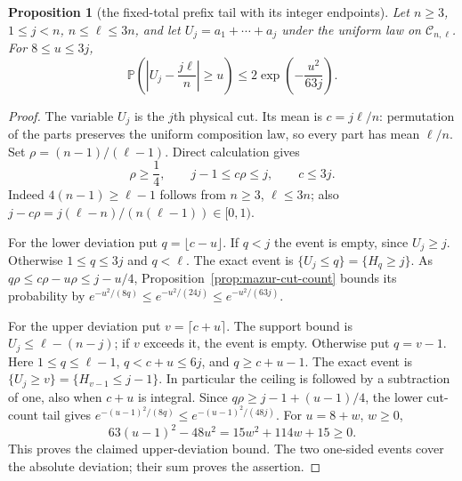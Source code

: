 \documentclass[11pt]{article}
\newtheorem{proposition}{Proposition}
\theoremstyle{remark}\newtheorem{remark}[proposition]{Remark}
\begin{document}
\begin{proposition}[the fixed-total prefix tail with its integer endpoints]
\label{prop:mazur-order-statistic}
Let $n\ge3$, $1\le j<n$, $n\le\ell\le3n$, and let
$U_j=a_1+\cdots+a_j$ under the uniform law on $\mathcal C_{n,\ell}$.
For $8\le u\le3j$,
\begin{equation}
 \mathbb P\left(\left|U_j-\frac{j\ell}{n}\right|\ge u\right)
 \le 2\exp\left(-\frac{u^2}{63j}\right).
 \label{eq:mazur-order-statistic}
\end{equation}
\end{proposition}
\begin{proof}
The variable $U_j$ is the $j$th physical cut. Its mean is
$c=j\ell/n$: permutation of the parts preserves the uniform
composition law, so every part has mean $\ell/n$.
Set $\rho=(n-1)/(\ell-1)$. Direct calculation gives
\[
 \rho\ge\frac14,\qquad j-1\le c\rho\le j,\qquad c\le3j.
\]
Indeed $4(n-1)\ge\ell-1$ follows from $n\ge3$, $\ell\le3n$;
also $j-c\rho=j(\ell-n)/(n(\ell-1))\in[0,1)$.

For the lower deviation put $q=\lfloor c-u\rfloor$.
If $q<j$ the event is empty, since $U_j\ge j$.
Otherwise $1\le q\le3j$ and $q<\ell$. The exact event is
$\{U_j\le q\}=\{H_q\ge j\}$.
As $q\rho\le c\rho-u\rho\le j-u/4$,
Proposition~\ref{prop:mazur-cut-count} bounds its probability by
$e^{-u^2/(8q)}\le e^{-u^2/(24j)}\le e^{-u^2/(63j)}$.

For the upper deviation put $v=\lceil c+u\rceil$.
The support bound is $U_j\le\ell-(n-j)$; if $v$ exceeds it,
the event is empty. Otherwise put $q=v-1$.
Here $1\le q\le\ell-1$, $q<c+u\le6j$, and $q\ge c+u-1$.
The exact event is
$\{U_j\ge v\}=\{H_{v-1}\le j-1\}$.
In particular the ceiling is followed by a subtraction of one,
also when $c+u$ is integral. Since
$q\rho\ge j-1+(u-1)/4$, the lower cut-count tail gives
$e^{-(u-1)^2/(8q)}\le e^{-(u-1)^2/(48j)}$.
For $u=8+w$, $w\ge0$,
\[
 63(u-1)^2-48u^2=15w^2+114w+15\ge0.
\]
This proves the claimed upper-deviation bound.
The two one-sided events cover the absolute deviation; their sum
proves the assertion.
\end{proof}
\end{document}
